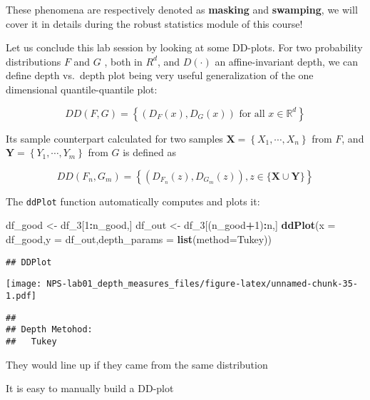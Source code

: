 \documentclass[
]{article}
\newenvironment{Shaded}{\begin{snugshade}}{\end{snugshade}}
\newcommand{\AttributeTok}[1]{\textcolor[rgb]{0.13,0.29,0.53}{#1}}
\newcommand{\DecValTok}[1]{\textcolor[rgb]{0.00,0.00,0.81}{#1}}
\newcommand{\FunctionTok}[1]{\textcolor[rgb]{0.13,0.29,0.53}{\textbf{#1}}}
\newcommand{\NormalTok}[1]{#1}
\newcommand{\OtherTok}[1]{\textcolor[rgb]{0.56,0.35,0.01}{#1}}
\newcommand{\SpecialCharTok}[1]{\textcolor[rgb]{0.81,0.36,0.00}{\textbf{#1}}}
\newcommand{\StringTok}[1]{\textcolor[rgb]{0.31,0.60,0.02}{#1}}
\begin{document}
These phenomena are respectively denoted as \textbf{masking} and
\textbf{swamping}, we will cover it in details during the robust
statistics module of this course!

Let us conclude this lab session by looking at some DD-plots. For two
probability distributions \(F\) and \(G\) , both in \(R ^d\), and
\(D(\cdot)\) an affine-invariant depth, we can define depth vs.~depth
plot being very useful generalization of the one dimensional
quantile-quantile plot:

\[
D D(F, G)=\left\{\left(D_{F}(x), D_{G}(x)\right) \text { for all } x \in \mathbb{R}^{d}\right\}
\]

Its sample counterpart calculated for two samples
\(\mathbf{X} =\left\{X_1, \cdots, X_n \right\}\) from \(F\), and
\(\mathbf{Y} =\left\{Y_1, \cdots, Y_m \right\}\) from \(G\) is defined
as

\[
D D\left(F_{n}, G_{m}\right)=\left\{\left(D_{F_{n}}(z), D_{G_{m}}(z)\right), z \in\{\mathbf{X} \cup \mathbf{Y}\}\right\}
\]

The \texttt{ddPlot} function automatically computes and plots it:

\begin{Shaded}
\begin{Highlighting}[]
\NormalTok{df\_good }\OtherTok{\textless{}{-}}\NormalTok{ df\_3[}\DecValTok{1}\SpecialCharTok{:}\NormalTok{n\_good,]}
\NormalTok{df\_out }\OtherTok{\textless{}{-}}\NormalTok{ df\_3[(n\_good}\SpecialCharTok{+}\DecValTok{1}\NormalTok{)}\SpecialCharTok{:}\NormalTok{n,]}
\FunctionTok{ddPlot}\NormalTok{(}\AttributeTok{x =}\NormalTok{ df\_good,}\AttributeTok{y =}\NormalTok{ df\_out,}\AttributeTok{depth\_params =} \FunctionTok{list}\NormalTok{(}\AttributeTok{method=}\StringTok{\textquotesingle{}Tukey\textquotesingle{}}\NormalTok{))}
\end{Highlighting}
\end{Shaded}

\begin{verbatim}
## DDPlot
\end{verbatim}

\texttt{[image: NPS-lab01\_depth\_measures\_files/figure-latex/unnamed-chunk-35-1.pdf]}

\begin{verbatim}
## 
## Depth Metohod:
##   Tukey
\end{verbatim}

They would line up if they came from the same distribution

It is easy to manually build a DD-plot
\end{document}
